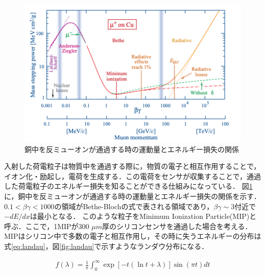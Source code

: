 \begin{figure}[h]
  \centering
  \includegraphics[width=13cm]{./figure/BB.png}
  \caption{銅中を反ミューオンが通過する時の運動量とエネルギー損失の関係\cite{Tanabashi:2018oca}}
  \label{fig:bb}
\end{figure}

入射した荷電粒子は物質中を通過する際に，物質の電子と相互作用することで，イオン化・励起し，電荷を生成する．この電荷をセンサが収集することで，通過した荷電粒子のエネルギー損失を知ることができる仕組みになっている．
図\ref{fig:bb}に，銅中を反ミューオンが通過する時の運動量とエネルギー損失の関係を示す．$0.1 < \beta \gamma <1000$の領域がBethe-Blochの式で表される領域であり，$\beta \gamma \sim 3$付近で$-dE/dx$は最小となる．
このような粒子をMinimum Ionization Particle(MIP)と呼ぶ．ここで，1MIPが300 $\mu m$厚のシリコンセンサを通過した場合を考える．MIPはシリコン中で多数の電子と相互作用し，その時に失うエネルギーの分布は式\ref{eq:landau}，図\ref{fig:landau}で示すようなランダウ分布になる．

\begin{eqnarray}
  \label{eq:landau}
  f(\lambda) = \frac{1}{\pi} \int ^{\infty} _0 \exp[-t (\ln t+\lambda) ] \sin(\pi t) dt
\end{eqnarray}

